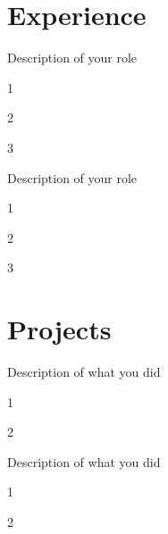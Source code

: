 \documentclass[]{deedy-resume-openfont}
\begin{document}
\hfill
\begin{minipage}[t]{0.66\textwidth}


\section{Experience}

\vspace{\topsep} %
\begin{tightemize}
\item Description of your role
\item 1
\item 2
\item 3
\end{tightemize}
\sectionsep


\begin{tightemize}
\item Description of your role
\item 1
\item 2
\item 3
\end{tightemize}
\sectionsep


\section{Projects}
\begin{tightemize}
\item Description of what you did
\item 1
\item 2
\end{tightemize}
\sectionsep

\begin{tightemize}
\item Description of what you did
\item 1
\item 2
\end{tightemize}
\sectionsep


\end{minipage}
\end{document}
